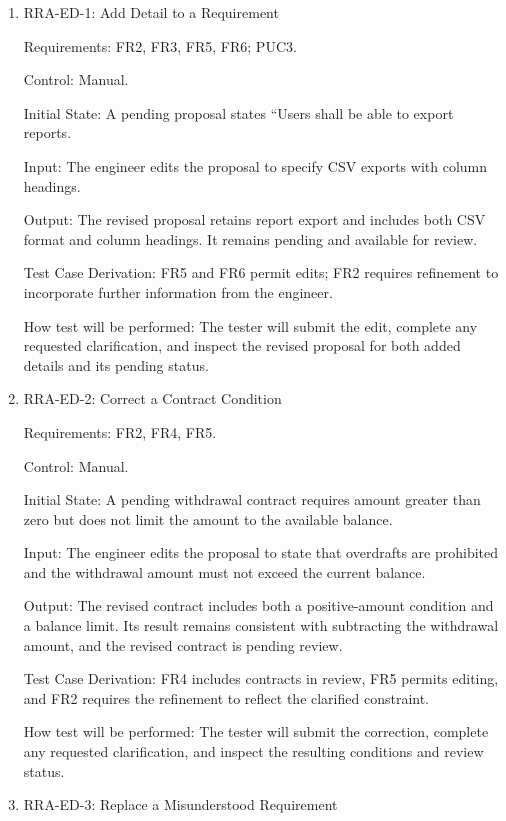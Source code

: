 \documentclass[12pt, titlepage]{article}
\begin{document}
\begin{enumerate}

\item{RRA-ED-1: Add Detail to a Requirement\\}

Requirements: FR2, FR3, FR5, FR6; PUC3.

Control: Manual.

Initial State: A pending proposal states ``Users shall be able to export reports.

Input: The engineer edits the proposal to specify CSV exports with column headings.

Output: The revised proposal retains report export and includes both CSV
format and column headings. It remains pending and available for review.

Test Case Derivation: FR5 and FR6 permit edits; FR2 requires refinement to
incorporate further information from the engineer.

How test will be performed: The tester will submit the edit, complete any
requested clarification, and inspect the revised proposal for both added
details and its pending status.

\item{RRA-ED-2: Correct a Contract Condition\\}

Requirements: FR2, FR4, FR5.

Control: Manual.

Initial State: A pending withdrawal contract requires amount greater than zero
but does not limit the amount to the available balance.

Input: The engineer edits the proposal to state that overdrafts are prohibited
and the withdrawal amount must not exceed the current balance.

Output: The revised contract includes both a positive-amount condition and a
balance limit. Its result remains consistent with subtracting the withdrawal
amount, and the revised contract is pending review.

Test Case Derivation: FR4 includes contracts in review, FR5 permits editing,
and FR2 requires the refinement to reflect the clarified constraint.

How test will be performed: The tester will submit the correction, complete
any requested clarification, and inspect the resulting conditions and review
status.

\item{RRA-ED-3: Replace a Misunderstood Requirement\\}


\end{enumerate}
\end{document}
